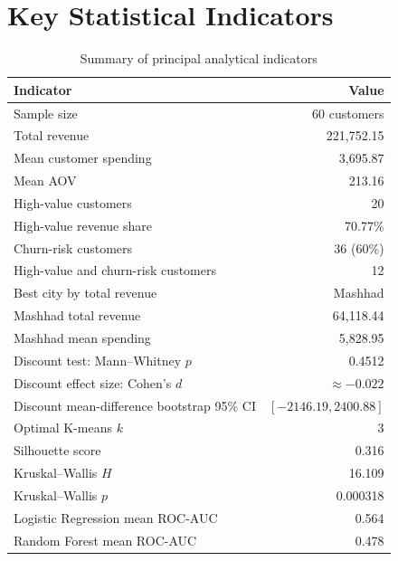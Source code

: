\documentclass[11pt,a4paper]{article}
\begin{document}
\section{Key Statistical Indicators}

\begin{table}[H]
\centering
\caption{Summary of principal analytical indicators}
\begin{tabular}{lr}
\toprule
Indicator & Value \\
\midrule
Sample size & 60 customers \\
Total revenue & 221,752.15 \\
Mean customer spending & 3,695.87 \\
Mean AOV & 213.16 \\
High-value customers & 20 \\
High-value revenue share & 70.77\% \\
Churn-risk customers & 36 (60\%) \\
High-value and churn-risk customers & 12 \\
Best city by total revenue & Mashhad \\
Mashhad total revenue & 64,118.44 \\
Mashhad mean spending & 5,828.95 \\
Discount test: Mann--Whitney $p$ & 0.4512 \\
Discount effect size: Cohen's $d$ & $\approx -0.022$ \\
Discount mean-difference bootstrap 95\% CI & $[-2146.19,2400.88]$ \\
Optimal K-means $k$ & 3 \\
Silhouette score & 0.316 \\
Kruskal--Wallis $H$ & 16.109 \\
Kruskal--Wallis $p$ & 0.000318 \\
Logistic Regression mean ROC-AUC & 0.564 \\
Random Forest mean ROC-AUC & 0.478 \\
\bottomrule
\end{tabular}
\end{table}
\end{document}
